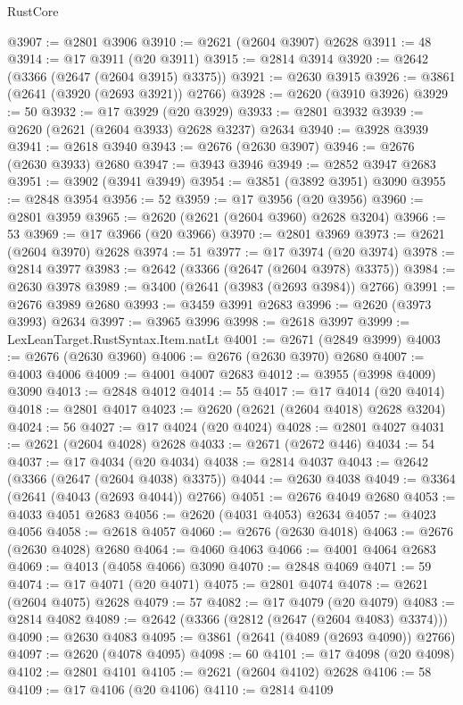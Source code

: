 \begin{lexlean}{RustCore}
\begin{coremodule}
@3907 := @2801 @3906
@3910 := @2621 (@2604 @3907) @2628
@3911 := 48
@3914 := @17 @3911 (@20 @3911)
@3915 := @2814 @3914
@3920 := @2642 (@3366 (@2647 (@2604 @3915) @3375))
@3921 := @2630 @3915
@3926 := @3861 (@2641 (@3920 (@2693 @3921)) @2766)
@3928 := @2620 (@3910 @3926)
@3929 := 50
@3932 := @17 @3929 (@20 @3929)
@3933 := @2801 @3932
@3939 := @2620 (@2621 (@2604 @3933) @2628 @3237) @2634
@3940 := @3928 @3939
@3941 := @2618 @3940
@3943 := @2676 (@2630 @3907)
@3946 := @2676 (@2630 @3933) @2680
@3947 := @3943 @3946
@3949 := @2852 @3947 @2683
@3951 := @3902 (@3941 @3949)
@3954 := @3851 (@3892 @3951) @3090
@3955 := @2848 @3954
@3956 := 52
@3959 := @17 @3956 (@20 @3956)
@3960 := @2801 @3959
@3965 := @2620 (@2621 (@2604 @3960) @2628 @3204)
@3966 := 53
@3969 := @17 @3966 (@20 @3966)
@3970 := @2801 @3969
@3973 := @2621 (@2604 @3970) @2628
@3974 := 51
@3977 := @17 @3974 (@20 @3974)
@3978 := @2814 @3977
@3983 := @2642 (@3366 (@2647 (@2604 @3978) @3375))
@3984 := @2630 @3978
@3989 := @3400 (@2641 (@3983 (@2693 @3984)) @2766)
@3991 := @2676 @3989 @2680
@3993 := @3459 @3991 @2683
@3996 := @2620 (@3973 @3993) @2634
@3997 := @3965 @3996
@3998 := @2618 @3997
@3999 := LexLeanTarget.RustSyntax.Item.natLt
@4001 := @2671 (@2849 @3999)
@4003 := @2676 (@2630 @3960)
@4006 := @2676 (@2630 @3970) @2680
@4007 := @4003 @4006
@4009 := @4001 @4007 @2683
@4012 := @3955 (@3998 @4009) @3090
@4013 := @2848 @4012
@4014 := 55
@4017 := @17 @4014 (@20 @4014)
@4018 := @2801 @4017
@4023 := @2620 (@2621 (@2604 @4018) @2628 @3204)
@4024 := 56
@4027 := @17 @4024 (@20 @4024)
@4028 := @2801 @4027
@4031 := @2621 (@2604 @4028) @2628
@4033 := @2671 (@2672 @446)
@4034 := 54
@4037 := @17 @4034 (@20 @4034)
@4038 := @2814 @4037
@4043 := @2642 (@3366 (@2647 (@2604 @4038) @3375))
@4044 := @2630 @4038
@4049 := @3364 (@2641 (@4043 (@2693 @4044)) @2766)
@4051 := @2676 @4049 @2680
@4053 := @4033 @4051 @2683
@4056 := @2620 (@4031 @4053) @2634
@4057 := @4023 @4056
@4058 := @2618 @4057
@4060 := @2676 (@2630 @4018)
@4063 := @2676 (@2630 @4028) @2680
@4064 := @4060 @4063
@4066 := @4001 @4064 @2683
@4069 := @4013 (@4058 @4066) @3090
@4070 := @2848 @4069
@4071 := 59
@4074 := @17 @4071 (@20 @4071)
@4075 := @2801 @4074
@4078 := @2621 (@2604 @4075) @2628
@4079 := 57
@4082 := @17 @4079 (@20 @4079)
@4083 := @2814 @4082
@4089 := @2642 (@3366 (@2812 (@2647 (@2604 @4083) @3374)))
@4090 := @2630 @4083
@4095 := @3861 (@2641 (@4089 (@2693 @4090)) @2766)
@4097 := @2620 (@4078 @4095)
@4098 := 60
@4101 := @17 @4098 (@20 @4098)
@4102 := @2801 @4101
@4105 := @2621 (@2604 @4102) @2628
@4106 := 58
@4109 := @17 @4106 (@20 @4106)
@4110 := @2814 @4109

\end{coremodule}
\end{lexlean}
